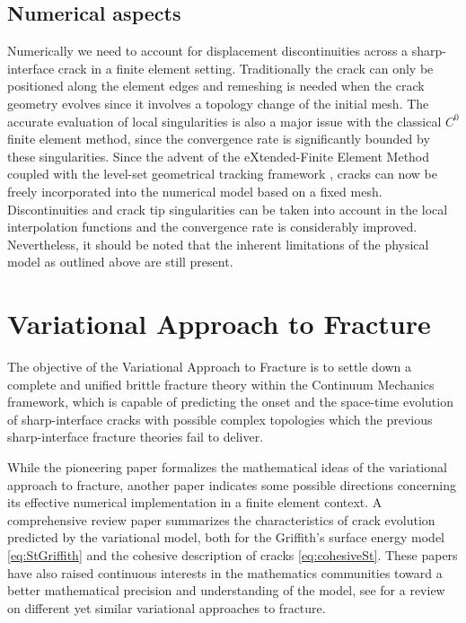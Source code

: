 \subsection{Numerical aspects}
Numerically we need to account for displacement discontinuities across a sharp-interface crack in a finite element setting. Traditionally the crack can only be positioned along the element edges and remeshing is needed when the crack geometry evolves since it involves a topology change of the initial mesh. The accurate evaluation of local singularities is also a major issue with the classical $C^0$ finite element method, since the convergence rate is significantly bounded by these singularities. Since the advent of the eXtended-Finite Element Method \cite{Moes:1999aa} coupled with the level-set geometrical tracking framework \cite{Stolarska:2001aa}, cracks can now be freely incorporated into the numerical model based on a fixed mesh. Discontinuities and crack tip singularities can be taken into account in the local interpolation functions and the convergence rate is considerably improved. Nevertheless, it should be noted that the inherent limitations of the physical model as outlined above are still present.

\section{Variational Approach to Fracture} \label{sec:fm98}
The objective of the Variational Approach to Fracture is to settle down a complete and unified brittle fracture theory within the Continuum Mechanics framework, which is capable of predicting the onset and the space-time evolution of sharp-interface cracks with possible complex topologies which the previous sharp-interface fracture theories fail to deliver.

While the pioneering paper \cite{FrancfortMarigo:1998} formalizes the mathematical ideas of the variational approach to fracture, another paper \cite{BourdinFrancfortMarigo:2000} indicates some possible directions concerning its effective numerical implementation in a finite element context. A comprehensive review paper \cite{BourdinFrancfortMarigo:2008} summarizes the characteristics of crack evolution predicted by the variational model, both for the Griffith's surface energy model \eqref{eq:StGriffith} and the cohesive description of cracks \eqref{eq:cohesiveSt}. These papers have also raised continuous interests in the mathematics communities toward a better mathematical precision and understanding of the model, see \cite{Negri:2010aa} for a review on different yet similar variational approaches to fracture.

